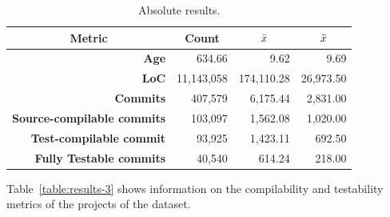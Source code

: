 \begin{table}[!htb]
    \centering
    \caption{Absolute results.}
    \label{table:results-1}
    \begin{tabular}{|r|r|r|r|}
        \hline
        \multicolumn{1}{|c|}{\textbf{Metric}}& \multicolumn{1}{c|}{\textbf{Count}} & \multicolumn{1}{c|}{\textbf{\large{$\bar{x}$}}} & \multicolumn{1}{c|}{\textbf{\large{$\tilde{x}$}}} \\ \hline
        \textbf{Age}                      & 634.66                              & 9.62                               & 9.69                                 \\ \hline
        \textbf{LoC}                      & 11,143,058                         & 174,110.28                          & 26,973.50                             \\ \hline
        \textbf{Commits}                  & 407,579                           & 6,175.44                            & 2,831.00                              \\ \hline
        \textbf{Source-compilable commits} & 103,097                           & 1,562.08                            & 1,020.00                              \\ \hline
        \textbf{Test-compilable commit}    & 93,925                            & 1,423.11                            & 692.50                               \\ \hline
        \textbf{Fully Testable commits}   & 40,540                            & 614.24                             & 218.00                               \\ \hline
    \end{tabular}
\end{table}

Table~\ref{table:results-3} shows information on the compilability and testability metrics of the projects of the dataset. 

